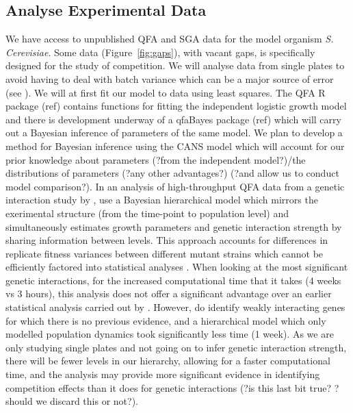 \subsection{Analyse Experimental Data}
\label{sec:analyse-data}
We have access to unpublished QFA and SGA data for the model organism
\textit{S. Cerevisiae}. Some data (Figure~\ref{fig:gaps}), with vacant
gaps, is specifically designed for the study of competition. We will
analyse data from single plates to avoid having to deal with batch
variance which can be a major source of error (see
\citet{Baryshnikova2010}). We will at first fit our model to data
using least squares. The QFA R package (ref) contains functions for
fitting the independent logistic growth model and there is development
underway of a qfaBayes package (ref) which will carry out a Bayesian
inference of parameters of the same model. We plan to develop a method
for Bayesian inference using the CANS model which will account for our
prior knowledge about parameters (?from the independent model?)/the
distributions of parameters (?any other advantages?) (?and allow us to
conduct model comparison?). In an analysis of high-throughput QFA data
from a genetic interaction study by \citet{Addinall2011},
\citet{Heydari2016} use a Bayesian hierarchical model which mirrors
the exerimental structure (from the time-point to population level)
and simultaneously estimates growth parameters and genetic interaction
strength by sharing information between levels. This approach accounts
for differences in replicate fitness variances between different
mutant strains which cannot be efficiently factored into statistical
analyses \citep{Heydari2016}. When looking at the most significant
genetic interactions, for the increased computational time that it
takes (4 weeks vs 3 hours), this analysis does not offer a significant
advantage over an earlier statistical analysis carried out by
\citet{Addinall2011}. However, \citet{Heydari2016} do identify weakly
interacting genes for which there is no previous evidence, and a
hierarchical model which only modelled population dynamics took
significantly less time (1 week). As we are only studying single plates
and not going on to infer genetic interaction strength, there will be
fewer levels in our hierarchy, allowing for a faster computational
time, and the analysis may provide more significant evidence in
identifying competition effects than it does for genetic interactions
(?is this last bit true? ?should we discard this or not?).

